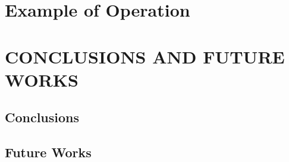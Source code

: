 \documentclass[a4paper, 10pt, conference]{ieeeconf}      %
\begin{document}
\section{Example of Operation}
\label{sect:Example}




\section{CONCLUSIONS AND FUTURE WORKS}
\label{sect:Conclusions}

\subsection{Conclusions}




\subsection{Future Works}



\end{document}
